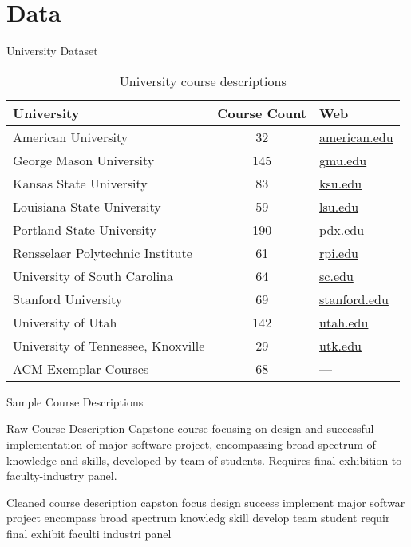 \documentclass[10pt, compress]{beamer}
\begin{document}
\section{Data}


\begin{frame}{University Dataset}
  \begin{table}
    \begin{tabular}{lcl}
      \toprule
      University & Course Count & Web \\
      \midrule
      American University & 32 & \href{http://american.edu}{american.edu} \\
      George Mason University & 145 & \href{http://gmu.edu}{gmu.edu} \\
      Kansas State University & 83 & \href{http://ksu.edu}{ksu.edu} \\
      Louisiana State University & 59 & \href{http://lsu.edu}{lsu.edu} \\
      Portland State University & 190 & \href{http://pdx.edu}{pdx.edu} \\
      Rensselaer Polytechnic Institute & 61 & \href{http://rpi.edu}{rpi.edu} \\
      University of South Carolina & 64 & \href{http://sc.edu}{sc.edu} \\
      Stanford University & 69 & \href{http://stanford.edu}{stanford.edu} \\
      University of Utah & 142 & \href{http://utah.edu}{utah.edu} \\
      University of Tennessee, Knoxville & 29 & \href{http://utk.edu}{utk.edu} \\
      \midrule
      ACM Exemplar Courses & 68 & --- \\
      \bottomrule
    \end{tabular}
    \caption{University course descriptions}
  \end{table}
\end{frame}


\begin{frame}{Sample Course Descriptions}
  \begin{block}{Raw Course Description}
    Capstone course focusing on design and successful implementation of
    major software project, encompassing broad spectrum of knowledge and
    skills, developed by team of students. Requires final exhibition to
    faculty-industry panel.
  \end{block}

  \begin{block}{Cleaned course description}
    capston focus design success implement major softwar project encompass
    broad spectrum knowledg skill develop team student requir final exhibit
    faculti industri panel
  \end{block}
\end{frame}
\end{document}
